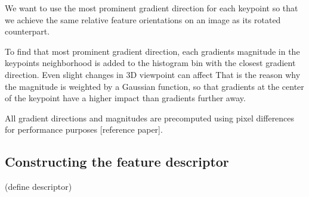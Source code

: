 \documentclass{article}
\begin{document}
	We want to use the most prominent gradient direction for each keypoint so that we achieve the same relative feature orientations on an image as its rotated counterpart.
	
	To find that most prominent gradient direction, each gradients magnitude in the keypoints neighborhood is added to the histogram bin with the closest gradient direction.  Even slight changes in 3D viewpoint can affect 
	That is the reason why the magnitude is weighted by a Gaussian function, so that gradients at the center of the keypoint have a higher impact than gradients further away.
	
	All gradient directions and magnitudes are precomputed using pixel differences for performance purposes [reference paper].
	
	
	\subsection{Constructing the feature descriptor}
	
	(define descriptor)
\end{document}
